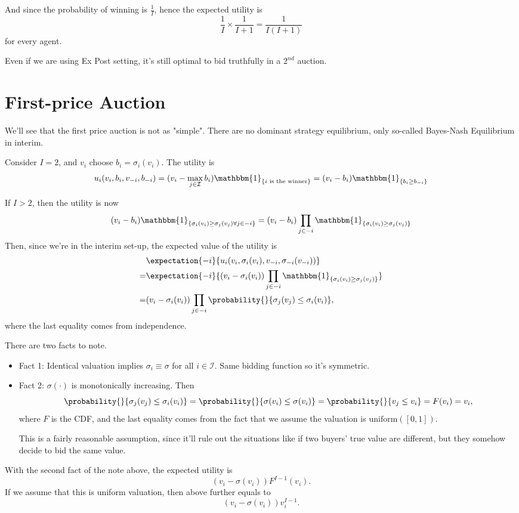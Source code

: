 And since the probability of winning is \(\frac{1}{I}\), hence the expected utility is
\[
	\frac{1}{I}\times \frac{1}{I+1} = \frac{1}{I(I + 1)}
\]
for every agent.

\begin{note}
	Even if we are using Ex Post setting, it's still optimal to bid truthfully in a \(2^{nd}\) auction.
\end{note}

\section{First-price Auction}
We'll see that the first price auction is not as "simple". There are no dominant strategy equilibrium, only so-called
Bayes-Nash Equilibrium in interim.

\hr

Consider \(I = 2\), and \(v_{i}\) choose \(b_{i} = \sigma_{i}(v_{i})\). The utility is
\[
	u_{i}(v_{i}, b_{i}, v_{-i}, b_{-i}) = (v_{i} - \max_{j\in \mathcal{I} }b_{i})\mathbbm{1}_{\{ i \text{ is the winner} \}} = (v_{i} - b_{i})\mathbbm{1}_{\{ b_{i}\geq b_{-i} \}}
\]

If \(I>2\), then the utility is now
\[
	(v_{i} - b_{i})\mathbbm{1}_{\{ \sigma_{i}(v_{i})\geq \sigma_{j}(v_{j})\forall j\in -i \}} = (v_{i} - b_{i})\prod\limits_{j\in -i} \mathbbm{1}_{\{ \sigma_{i}(v_{i})\geq \sigma_{j}(v_{j}) \}}
\]
Then, since we're in the interim set-up, the expected value of the utility is
\[
	\begin{split}
		&\expectation{-i}{u_{i}(v_{i}, \sigma_{i}(v_{i}), v_{-i}, \sigma_{-i}(v_{-i}))} \\
		= &\expectation{-i}{(v_{i} - \sigma_{i}(v_{i})) \prod\limits_{j\in -i}\mathbbm{1}_{\{ \sigma_{i}(v_{i})\geq \sigma_{j}(v_{j}) \}}}\\
		= &(v_{i} - \sigma_{i}(v_{i}))\prod\limits_{j\in -i}\probability{}{\sigma_{j}(v_{j})\leq \sigma_{i}(v_{i})},
	\end{split}
\]
where the last equality comes from independence.

\begin{note}
	There are two facts to note.
	\begin{itemize}
		\item Fact 1: Identical valuation implies \(\sigma_{i} \equiv \sigma\) for all \(i\in \mathcal{I} \). Same bidding function so it's symmetric.
		\item Fact 2: \(\sigma(\cdot)\) is monotonically increasing. Then
		      \[
			      \probability{}{\sigma_{j}(v_{j})\leq \sigma_{i}(v_{i})} = \probability{}{\sigma(v_{i})\leq \sigma(v_{i})} = \probability{}{v_{j}\leq v_{i}} = F(v_{i}) = v_{i},
		      \]
		      where \(F\) is the CDF, and the last equality comes from the fact that we assume the valuation is \(\mathrm{uniform}([0, 1])\).

		      This is a fairly reasonable assumption, since it'll rule out the situations like if two buyers' true value are different, but they somehow decide to bid
		      the same value.
	\end{itemize}
\end{note}

With the second fact of the note above, the expected utility is
\[
	(v_{i} - \sigma(v_{i})) F^{I-1}(v_{i}).
\]
If we assume that this is uniform valuation, then above further equals to
\[
	(v_{i} - \sigma(v_{i}))v^{I-1}_{i}.
\]